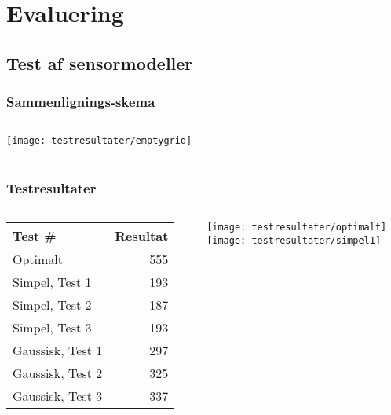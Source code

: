 \section{Evaluering}

\subsection{Test af sensormodeller}
\begin{frame}
\frametitle{Sammenlignings-skema}
\begin{columns}
\begin{column}{.59\textwidth}
\begin{center}
\texttt{[image: testresultater/emptygrid]}\\

\end{center}
\end{column}
\begin{column}{.40\textwidth}
\\
\end{column}
\end{columns}
\end{frame}

\begin{frame}
\frametitle{Testresultater}
\begin{columns}
\begin{column}{.59\textwidth}
\begin{center}
\begin{tabular}{|l|r|}
\hline
\textbf{Test \#} & \textbf{Resultat} \\ \hline \hline
Optimalt & 555 \\ \hline \hline
Simpel, Test 1 & 193 \\ \hline
Simpel, Test 2 & 187 \\ \hline
Simpel, Test 3 & 193 \\ \hline \hline
Gaussisk, Test 1 & 297 \\ \hline
Gaussisk, Test 2 & 325 \\ \hline
Gaussisk, Test 3 & 337 \\ \hline
\end{tabular}
\end{center}
\end{column}
\begin{column}{.40\textwidth}
\texttt{[image: testresultater/optimalt]}\\
\texttt{[image: testresultater/simpel1]}
\end{column}
\end{columns}
\end{frame}


